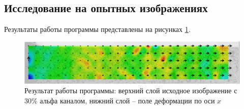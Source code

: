 \subsection{Исследование на опытных изображениях}
Результаты работы программы представлены на рисунках \ref{fig:al_strain}.
\begin{figure}
\centering
\includegraphics[width=0.7\linewidth]{images/al_strain}
\caption{Результат работы программы: верхний слой исходное изображение с 30\% альфа каналом, нижний слой -- поле деформации по оси $x$}
\label{fig:al_strain}
\end{figure}
